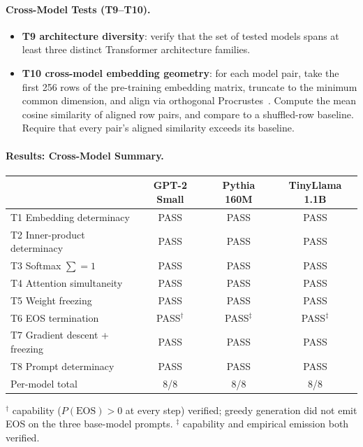 \documentclass[a4paper,twocolumn,11pt]{article}
\begin{document}
\paragraph{Cross-Model Tests (T9--T10).}

\begin{itemize}[noitemsep]
\item \textbf{T9 architecture diversity}: verify that the set of tested models spans at least three distinct Transformer architecture families.
\item \textbf{T10 cross-model embedding geometry}: for each model pair, take the first 256 rows of the pre-training embedding matrix, truncate to the minimum common dimension, and align via orthogonal Procrustes~\cite{Schoenemann1966}. Compute the mean cosine similarity of aligned row pairs, and compare to a shuffled-row baseline. Require that every pair's aligned similarity exceeds its baseline.
\end{itemize}

\paragraph{Results: Cross-Model Summary.}

\begin{center}
\begin{tabular}{@{}lccc@{}}
\toprule
& GPT-2 Small & Pythia 160M & TinyLlama 1.1B \\
\midrule
T1 Embedding determinacy      & PASS & PASS & PASS \\
T2 Inner-product determinacy  & PASS & PASS & PASS \\
T3 Softmax $\sum = 1$         & PASS & PASS & PASS \\
T4 Attention simultaneity     & PASS & PASS & PASS \\
T5 Weight freezing            & PASS & PASS & PASS \\
T6 EOS termination            & PASS$^\dagger$ & PASS$^\ddagger$ & PASS$^\ddagger$ \\
T7 Gradient descent + freezing & PASS & PASS & PASS \\
T8 Prompt determinacy         & PASS & PASS & PASS \\
\midrule
Per-model total & 8/8 & 8/8 & 8/8 \\
\bottomrule
\end{tabular}
\end{center}

$^\dagger$ capability ($P(\mathrm{EOS}) > 0$ at every step) verified; greedy generation did not emit EOS on the three base-model prompts. $^\ddagger$ capability and empirical emission both verified.
\end{document}
